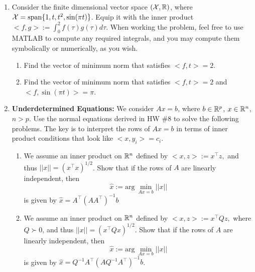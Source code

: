 \documentclass[letterpaper]{article}
\begin{document}
\begin{enumerate}


\item Consider the finite dimensional vector space $({\cal X}, \mathbb R)$, where ${\cal X} = \textrm{span} \{ 1, t, t^2, \sin(\pi t) \}$. Equip it with the inner product $<f,g>:=\int_{0}^2 f(\tau) g(\tau) d\tau$.  When working the problem, feel free to use MATLAB to compute any required integrals, and you may compute them symbolically or numerically, as you wish.
     \begin{enumerate}
\setlength{\itemsep}{.1in}
\renewcommand{\labelenumi}{(\alph{enumi})}
\item Find the vector of minimum norm that satisfies $<f, t>=2$.

\item  Find the vector of minimum norm that satisfies $<f, t>=2$ and $<f,\sin(\pi t)>=\pi$.

\end{enumerate}

\item \textbf{Underdetermined Equations:} We consider
 $Ax=b$,
    where $b\in \mathbb R^p$, $x\in \mathbb R^n$, $n>p$.   Use the normal equations derived in HW \#8  to solve the following problems. The key is to interpret the rows of $Ax=b$ in terms of inner product conditions that look like $<x,y_i> = c_i$.
     \begin{enumerate}
\setlength{\itemsep}{.1in}
\renewcommand{\labelenumi}{(\alph{enumi})}
\item We assume an inner product on $\mathbb R^n$ defined by $<x,z>:= x^\top z,$
 and thus $||x|| = (x^\top x)^{1/2}$.  Show that if the rows of $A$ are linearly independent, then
    $$\widehat{x}:= \mathrm{arg}~\min_{Ax=b} ||x||$$
    is given by $ \widehat{x} = A^\top \left( A A^\top \right)^{-1}b$

\item  We assume an inner product on $\mathbb R^n$ defined by $<x,z>:= x^\top Q z,$
    where $Q \succ 0$, and thus $||x|| = (x^\top Q x)^{1/2}$.  Show that if the rows of $A$ are linearly independent, then
    $$\widehat{x}:= \mathrm{arg}~\min_{Ax=b} ||x||$$
    is given by $ \widehat{x} = Q^{-1} A^\top \left( A Q^{-1} A^\top \right)^{-1}b$.


\end{enumerate}
\end{enumerate}
\end{document}
